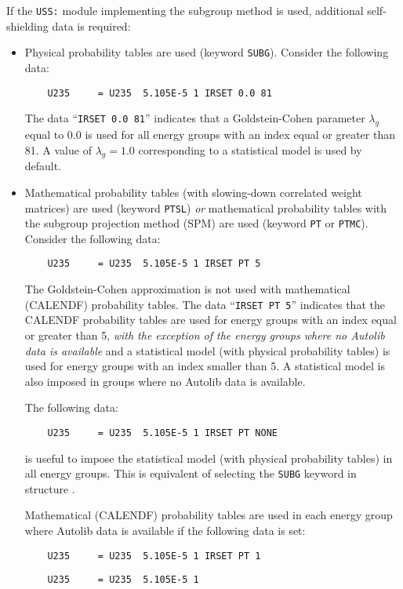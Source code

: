 If the {\tt USS:} module implementing the subgroup method is used,
additional self-shielding data is required:
\begin{itemize}
\item Physical probability tables are used (keyword {\tt SUBG}). Consider the following data:
\begin{verbatim}
    U235     = U235  5.105E-5 1 IRSET 0.0 81
\end{verbatim}
The data ``{\tt IRSET 0.0 81}'' indicates that a Goldstein-Cohen parameter
$\lambda_g$ equal
to 0.0 is used for all energy groups with an index equal or greater than 81. A value
of $\lambda_g=1.0$ corresponding to a statistical model is used by default.

\item Mathematical probability tables (with slowing-down correlated weight matrices) are used (keyword {\tt PTSL})
{\sl or} mathematical probability tables with the subgroup projection method (SPM)\cite{SPM09} are used (keyword {\tt PT}
or {\tt PTMC}). Consider the following data:
\begin{verbatim}
    U235     = U235  5.105E-5 1 IRSET PT 5
\end{verbatim}
The Goldstein-Cohen approximation is not used with mathematical (CALENDF) probability tables. The data ``{\tt IRSET PT 5}''
indicates that the CALENDF probability tables are used for energy groups with an index equal
or greater than 5, {\sl with the exception of the energy groups where no Autolib data
is available} and a statistical model (with physical probability tables) is used for energy groups with an index smaller
than 5. A statistical model is also imposed in groups where no Autolib data is available.

\vskip 0.15cm

The following data:
\begin{verbatim}
    U235     = U235  5.105E-5 1 IRSET PT NONE
\end{verbatim}
\noindent is useful to impose the statistical model (with physical probability tables) in all energy groups. This is equivalent of selecting
the {\tt SUBG} keyword in structure .

\vskip 0.15cm

Mathematical (CALENDF) probability tables are used in each energy group where Autolib data is available if the following data is set:
\begin{verbatim}
    U235     = U235  5.105E-5 1 IRSET PT 1
\end{verbatim}
\begin{verbatim}
    U235     = U235  5.105E-5 1
\end{verbatim}
\end{itemize}


